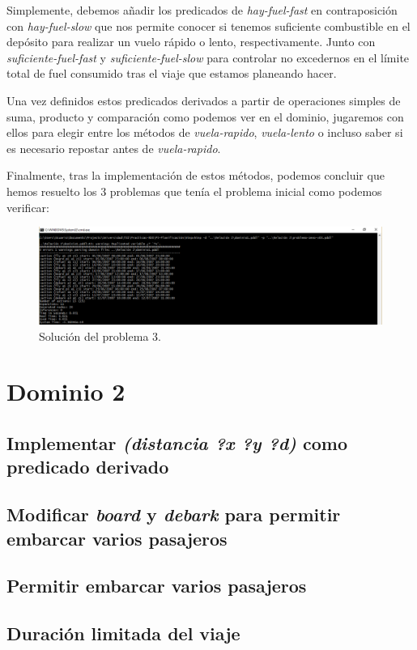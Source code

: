 \documentclass[a4paper, 11pt]{article}
\begin{document}
		Simplemente, debemos añadir los predicados de \textit{hay-fuel-fast} en contraposición con
		\textit{hay-fuel-slow} que nos permite conocer si tenemos suficiente combustible en el depósito
		para realizar un vuelo rápido o lento, respectivamente. Junto con \textit{suficiente-fuel-fast} y
		\textit{suficiente-fuel-slow} para controlar no excedernos en el límite total de fuel consumido tras
		el viaje que estamos planeando hacer.
		
		Una vez definidos estos predicados derivados a partir de operaciones simples de suma, producto y
		comparación como podemos ver en el dominio, jugaremos con ellos para elegir entre los métodos de
		\textit{vuela-rapido}, \textit{vuela-lento} o incluso saber si es necesario repostar antes de
		\textit{vuela-rapido}.
		
		Finalmente, tras la implementación de estos métodos, podemos concluir que hemos resuelto los 3
		problemas que tenía el problema inicial como podemos verificar:
		\begin{figure}[H]
			\centering
			\includegraphics[width=15cm]{Ej1-problema3.png}
			\caption{Solución del problema 3.}
			\label{Prob-3}
		\end{figure}

\section{Dominio 2}
	\subsection{Implementar \textit{(distancia ?x ?y ?d)} como predicado derivado}
	\subsection{Modificar \textit{board} y \textit{debark} para permitir embarcar varios pasajeros}
	\subsection{Permitir embarcar varios pasajeros}
	\subsection{Duración limitada del viaje}
\end{document}
